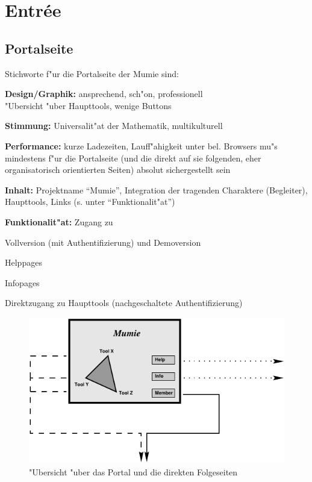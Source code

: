 
\section{Entr\'{e}e}\label{entree}


\subsection{Portalseite}

Stichworte f"ur die Portalseite der Mumie sind: 

\begin{list_sabina}
\item
\textbf{Design/Graphik:} ansprechend, sch"on, professionell\\
"Ubersicht "uber Haupttools, wenige Buttons
\item
\textbf{Stimmung:} Universalit"at der Mathematik, multikulturell
\item
\textbf{Performance:} kurze Ladezeiten, Lauff"ahigkeit unter bel.
Browsers mu"s mindestens f"ur die Portalseite (und die direkt auf sie
folgenden, eher organisatorisch orientierten Seiten) absolut
sichergestellt sein
\item
\textbf{Inhalt:} Projektname ``Mumie'', Integration der tragenden 
Charaktere (Begleiter), Haupttools, Links (s. unter ``Funktionalit"at'')
\item
\textbf{Funktionalit"at:} Zugang zu
        \begin{sub_list_sabina}
        \item
        Vollversion (mit Authentifizierung) und Demoversion
        \item
        Helppages
        \item
        Infopages
        \item
        Direktzugang zu Haupttools (nachgeschaltete Authentifizierung)
        \end{sub_list_sabina}
\end{list_sabina}

\begin{figure}[h]
\begin{center}
\ifx\pdfoutput\undefined
\else
  \includegraphics{Skizzen/portal_main.pdf}
\fi
\caption{"Ubersicht "uber das Portal und die direkten Folgeseiten}
\end{center}
\end{figure}
 
